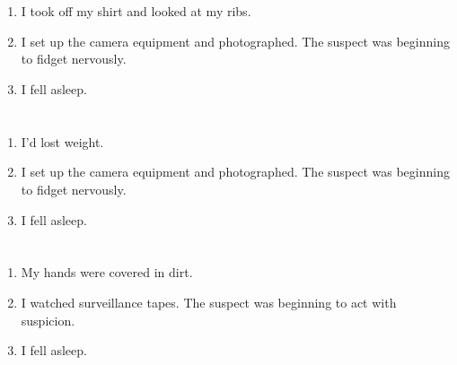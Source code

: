 \documentclass{article}
\begin{document}
    \newpage
    
    \section{}
    
    \begin{enumerate}
    
    \item I took off my shirt and looked at my ribs.\\
    
    \item I set up the camera equipment and photographed. The suspect was beginning to fidget nervously.\\
    
    \item I fell asleep.\\
    
    \end{enumerate}
     
    \newpage
    
    \section{}
    
    \begin{enumerate}
    
    \item I'd lost weight.\\
    
    \item I set up the camera equipment and photographed. The suspect was beginning to fidget nervously.\\
    
    \item I fell asleep.\\
    
    \end{enumerate}
     
    \newpage
    
    \section{}
    
    \begin{enumerate}
    
    \item My hands were covered in dirt.\\
    
    \item I watched surveillance tapes. The suspect was beginning to act with suspicion.\\
    
    \item I fell asleep.\\
    
    \end{enumerate}
     
\end{document}

